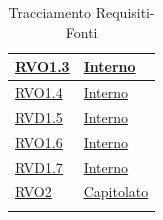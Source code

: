 \begin{longtable}{|>{\centering}m{5cm}|m{5cm}<{\centering}|}
\hyperlink{RVO1.3}{RVO1.3} & \hyperlink{Interno}{Interno}\\ \hline

\hyperlink{RVO1.4}{RVO1.4} & \hyperlink{Interno}{Interno}\\ \hline

\hyperlink{RVD1.5}{RVD1.5} & \hyperlink{Interno}{Interno}\\ \hline

\hyperlink{RVO1.6}{RVO1.6} & \hyperlink{Interno}{Interno}\\ \hline

\hyperlink{RVD1.7}{RVD1.7} & \hyperlink{Interno}{Interno}\\ \hline

\hyperlink{RVO2}{RVO2} & \hyperlink{Capitolato}{Capitolato}\\ \hline

\caption[Tracciamento Requisiti-Fonti]{Tracciamento Requisiti-Fonti}
\label{tabella:requi-fonti}
\end{longtable}

\clearpage

